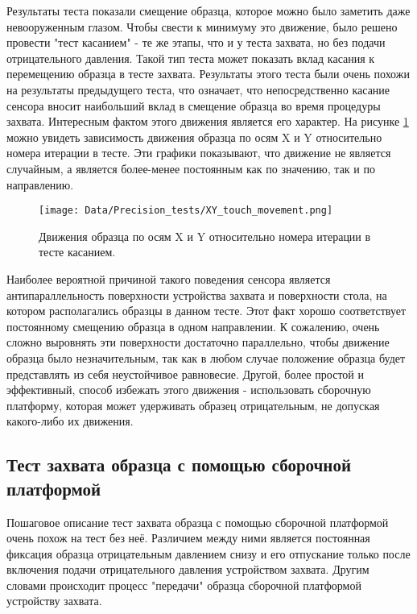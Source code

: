 Результаты теста показали смещение образца, которое можно было заметить даже невооруженным глазом. Чтобы свести к минимуму это движение, было решено провести "тест касанием" - те же этапы, что и у теста захвата, но без подачи отрицательного давления. Такой тип теста может показать вклад касания к перемещению образца в тесте захвата. Результаты этого теста были очень похожи на результаты предыдущего теста, что означает, что непосредственно касание сенсора вносит наибольший вклад в смещение образца во время процедуры захвата. Интересным фактом этого движения является его характер. На рисунке \ref{fig:touch_move} можно увидеть зависимость движения образца по осям X и Y относительно номера итерации в тесте. Эти графики показывают, что движение не является случайным, а является более-менее постоянным как по значению, так и по направлению.

\begin{figure}[ht]\centering
\texttt{[image: Data/Precision\_tests/XY\_touch\_movement.png]}
\caption{Движения образца по осям X и Y относительно номера итерации в тесте касанием.}
\label{fig:touch_move}
\end{figure}

Наиболее вероятной причиной такого поведения сенсора является антипараллельность поверхности устройства захвата и поверхности стола, на котором располагались образцы в данном тесте. Этот факт хорошо соответствует постоянному смещению образца в одном направлении. К сожалению, очень сложно выровнять эти поверхности достаточно параллельно, чтобы движение образца было незначительным, так как в любом случае положение образца будет представлять из себя неустойчивое равновесие. Другой, более простой и эффективный, способ избежать этого движения - использовать сборочную платформу, которая может удерживать образец отрицательным, не допуская какого-либо их движения.

\subsection{Тест захвата образца с помощью сборочной платформой}

Пошаговое описание тест захвата образца с помощью сборочной платформой очень похож на тест без неё. Различием между ними является постоянная фиксация образца отрицательным давлением снизу и его отпускание только после включения подачи отрицательного давления устройством захвата. Другим словами происходит процесс "передачи" образца сборочной платформой устройству захвата. 

